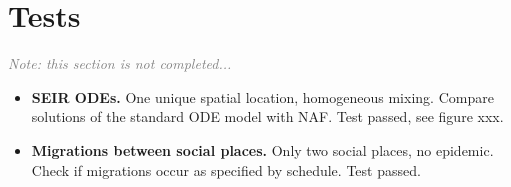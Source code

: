 \documentclass[11pt, onecolumn]{article}
\newcommand{\note}[1]{\textit{\textcolor{Grey}{Note: #1}}}
\newcommand{\naf}{\textsf{NAF}\xspace}
\begin{document}
\section{Tests}

\note{this section is not completed...}

\begin{itemize}
\item \textbf{SEIR ODEs.} One unique spatial location, homogeneous mixing. Compare solutions of the standard ODE model with \naf. Test passed, see figure xxx.
\item \textbf{Migrations between social places.} Only two social places, no epidemic. Check if migrations occur as specified by schedule. Test passed. 
\end{itemize}




\end{document}
